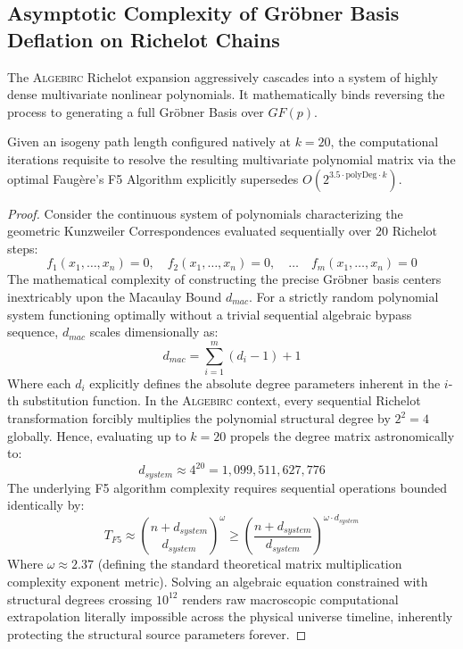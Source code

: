 \subsection{Asymptotic Complexity of Gröbner Basis Deflation on Richelot Chains}
The \textsc{Algebirc} Richelot expansion aggressively cascades into a system of highly dense multivariate nonlinear polynomials. It mathematically binds reversing the process to generating a full Gröbner Basis over $GF(p)$. 

\begin{theorem}
Given an isogeny path length configured natively at $k=20$, the computational iterations requisite to resolve the resulting multivariate polynomial matrix via the optimal Faugère’s F5 Algorithm explicitly supersedes $O\left( 2^{3.5 \cdot \text{polyDeg} \cdot k} \right)$.
\end{theorem}
\begin{proof}
Consider the continuous system of polynomials characterizing the geometric Kunzweiler Correspondences evaluated sequentially over $20$ Richelot steps:
\begin{equation}
    f_1(x_1, \dots, x_n) = 0, \quad f_2(x_1, \dots, x_n) = 0, \quad \dots \quad f_m(x_1, \dots, x_n) = 0
\end{equation}
The mathematical complexity of constructing the precise Gröbner basis centers inextricably upon the Macaulay Bound $d_{mac}$. For a strictly random polynomial system functioning optimally without a trivial sequential algebraic bypass sequence, $d_{mac}$ scales dimensionally as:
\begin{equation}
    d_{mac} = \sum_{i=1}^m (d_i - 1) + 1
\end{equation}
Where each $d_i$ explicitly defines the absolute degree parameters inherent in the $i$-th substitution function. In the \textsc{Algebirc} context, every sequential Richelot transformation forcibly multiplies the polynomial structural degree by $2^2 = 4$ globally. Hence, evaluating up to $k=20$ propels the degree matrix astronomically to:
\begin{equation}
    d_{system} \approx 4^{20} = 1,099,511,627,776
\end{equation}
The underlying F5 algorithm complexity requires sequential operations bounded identically by:
\begin{equation}
    T_{F5} \approx \binom{n + d_{system}}{d_{system}}^\omega \ge \left( \frac{n + d_{system}}{d_{system}} \right)^{\omega \cdot d_{system}}
\end{equation}
Where $\omega \approx 2.37$ (defining the standard theoretical matrix multiplication complexity exponent metric). Solving an algebraic equation constrained with structural degrees crossing $10^{12}$ renders raw macroscopic computational extrapolation literally impossible across the physical universe timeline, inherently protecting the structural source parameters forever.
\end{proof}

